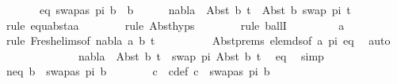 \begin{isabellebody}
\ \isanewline
\ \ \isacommand{{\isacharbraceleft}{\kern0pt}}\isamarkupfalse%
\ \isamarkupfalse%
\ eq{\isacharcolon}{\kern0pt}\ {\isachardoublequoteopen}swapas\ pi\ b\ {\isacharequal}{\kern0pt}\ b{\isachardoublequoteclose}\isanewline
\ \ \ \ \isamarkupfalse%
\ {\isachardoublequoteopen}nabla\ {\isasymturnstile}\ Abst\ b\ t{\isacharprime}{\kern0pt}\ {\isasymapprox}\ Abst\ b\ {\isacharparenleft}{\kern0pt}swap\ pi\ t{\isacharprime}{\kern0pt}{\isacharparenright}{\kern0pt}{\isachardoublequoteclose}\isanewline
\ \ \ \ \ \ \isamarkupfalse%
\ {\isacharparenleft}{\kern0pt}rule\ equ{\isacharunderscore}{\kern0pt}abst{\isacharunderscore}{\kern0pt}aa{\isacharparenright}{\kern0pt}\isanewline
\ \ \ \ \ \ \isamarkupfalse%
\ {\isacharparenleft}{\kern0pt}rule\ Abst{\isachardot}{\kern0pt}hyps{\isacharparenright}{\kern0pt}\isanewline
\ \ \ \ \ \ \isamarkupfalse%
\ {\isacharparenleft}{\kern0pt}rule\ ballI{\isacharparenright}{\kern0pt}\isanewline
\ \ \ \ \ \ \isamarkupfalse%
\ \ a\ \isanewline
\ \ \ \ \ \ \ \ \isamarkupfalse%
\ {\isacharparenleft}{\kern0pt}rule\ Fresh{\isacharunderscore}{\kern0pt}elims{\isacharparenleft}{\kern0pt}{}{\isacharparenright}{\kern0pt}{\isacharbrackleft}{\kern0pt}of\ nabla\ a\ b\ t{\isacharprime}{\kern0pt}{\isacharbrackright}{\kern0pt}{\isacharparenright}{\kern0pt}\isanewline
\ \ \ \ \ \ \ \ \isamarkupfalse%
\ Abst{\isachardot}{\kern0pt}prems\ elem{\isacharunderscore}{\kern0pt}ds{\isacharbrackleft}{\kern0pt}of\ a\ pi{\isacharbrackright}{\kern0pt}\ eq\ \isamarkupfalse%
\ auto\isanewline
\ \ \ \ \ \ \isamarkupfalse%
\isanewline
\ \ \ \ \isamarkupfalse%
\ \isamarkupfalse%
\ {\isachardoublequoteopen}nabla\ {\isasymturnstile}\ Abst\ b\ t{\isacharprime}{\kern0pt}\ {\isasymapprox}\ swap\ pi\ {\isacharparenleft}{\kern0pt}Abst\ b\ t{\isacharprime}{\kern0pt}{\isacharparenright}{\kern0pt}{\isachardoublequoteclose}\ \isamarkupfalse%
\ eq\ \isamarkupfalse%
\ simp\isanewline
\ \ \isacommand{{\isacharbraceright}{\kern0pt}}\isamarkupfalse%
\isanewline
\ \ \isamarkupfalse%
\isanewline
\ \ \isacommand{{\isacharbraceleft}{\kern0pt}}\isamarkupfalse%
\ \isamarkupfalse%
\ neq{\isacharcolon}{\kern0pt}\ {\isachardoublequoteopen}b\ {\isasymnoteq}\ swapas\ pi\ b{\isachardoublequoteclose}\ \ \isanewline
\ \ \ \ \isamarkupfalse%
\ c\ \ c{\isacharunderscore}{\kern0pt}def{\isacharcolon}{\kern0pt}\ {\isachardoublequoteopen}c\ {\isacharequal}{\kern0pt}\ swapas\ pi\ b{\isachardoublequoteclose}\ \isamarkupfalse%

\end{isabellebody}
